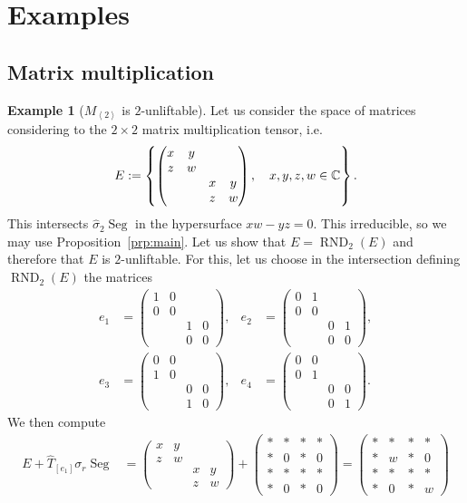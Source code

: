 \documentclass[a4paper,10pt]{article}
\def\set#1{\left\{#1\right\}}
\def\gener#1{\left\langle#1\right\rangle}
\def\mtrx#1{\begin{pmatrix}#1\end{pmatrix}}
\DeclareMathOperator{\RND}{RND}
\DeclareMathOperator{\Seg}{Seg}
\theoremstyle{definition}
\newtheorem{example}[theorem]{Example}
\theoremstyle{remark}
\begin{document}
\section{Examples}
\label{sec:examples}

\subsection{Matrix multiplication}

\begin{example}[$M_{\gener2}$ is $2$-unliftable]
    Let us consider the space of matrices considering to the $2\times2$ matrix multiplication tensor, i.e.
    \[
        E := \set{\mtrx{x&y&&\\z&w&&\\&&x&y\\&&z&w},\quad x,y,z,w\in\ce}.
    \]
    This intersects $\hat\sigma_2\Seg$ in the hypersurface $xw-yz=0$. This irreducible, so we may use Proposition~\ref{prp:main}. Let us show that $E=\RND_2(E)$ and therefore that $E$ is $2$-unliftable. For this, let us choose in the intersection defining $\RND_2(E)$ the matrices
    \begin{align*}
        e_1 &= \mtrx{1&0&&\\0&0&&\\&&1&0\\&&0&0}, &
        e_2 &= \mtrx{0&1&&\\0&0&&\\&&0&1\\&&0&0}, \\
        e_3 &= \mtrx{0&0&&\\1&0&&\\&&0&0\\&&1&0}, &
        e_4 &= \mtrx{0&0&&\\0&1&&\\&&0&0\\&&0&1}.
    \end{align*}
    We then compute
    \begin{align*}
        E+\hat T_{[e_1]}\sigma_r\Seg &= \mtrx{x&y&&\\z&w&&\\&&x&y\\&&z&w} + \mtrx{*&*&*&*\\ *&0&*&0\\ *&*&*&*\\ *&0&*&0} = \mtrx{*&*&*&*\\ *&w&*&0\\ *&*&*&*\\ *&0&*&w}

\end{align*}
\end{example}
\end{document}
